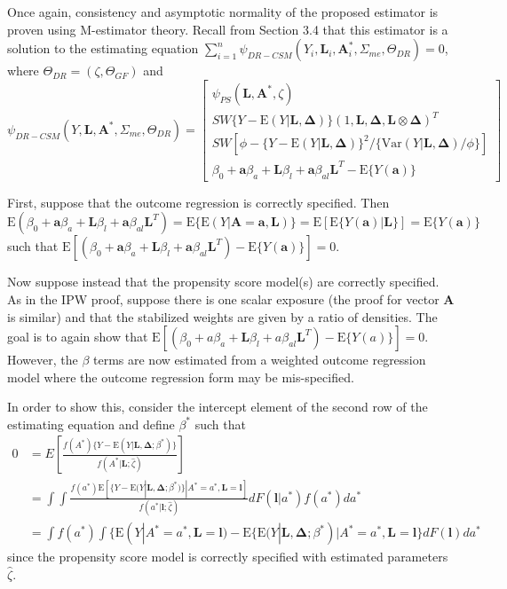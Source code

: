 \documentclass[12pt]{article}
\begin{document}
Once again, consistency and asymptotic normality of the proposed estimator is proven using M-estimator theory. Recall from Section 3.4 that this estimator is a solution to the estimating equation $\sum_{i=1}^{n} \psi_{DR-CSM}(Y_{i}, \bm{L}_{i}, \bm{A}_{i}^{*}, \Sigma_{me}, \Theta_{DR}) = 0$, where $\Theta_{DR} = (\zeta, \Theta_{GF})$ and
\begin{equation*}
    \psi_{DR-CSM}(Y, \bm{L}, \bm{A}^{*}, \Sigma_{me}, \Theta_{DR}) =
    \begin{bmatrix}
        \psi_{PS}(\bm{L}, \bm{A}^{*}, \zeta) \\
       SW\{ Y - \text{E}(Y | \bm{L}, \bm{\Delta}) \} (1, \bm{L}, \bm{\Delta}, \bm{L} \otimes \bm{\Delta})^{T} \\
        SW[\phi - \{ Y - \text{E}(Y | \bm{L}, \bm{\Delta}) \}^{2} / \{ \text{Var}(Y | \bm{L}, \bm{\Delta}) / \phi \}] \\
        \beta_{0} + \bm{a}\beta_{a} + \bm{L}\beta_{l} +
        \bm{a}\beta_{al}\bm{L}^{T} - \text{E} \{ Y(\bm{a}) \}
    \end{bmatrix}
\end{equation*}

First, suppose that the outcome regression is correctly specified. Then $\text{E}( \beta_{0} + \bm{a}\beta_{a} + \bm{L}\beta_{l} + \bm{a}\beta_{al}\bm{L}^{T}) = \text{E} \{ \text{E}(Y | \bm{A} = \bm{a}, \bm{L}) \} = \text{E}[\text{E} \{ Y(\bm{a}) | \bm{L} \}] = \text{E} \{ Y(\bm{a}) \}$ such that $\text{E}[(\beta_{0} + \bm{a}\beta_{a} + \bm{L}\beta_{l} + \bm{a}\beta_{al}\bm{L}^{T}) - \text{E} \{ Y(\bm{a}) \}] = 0$.

Now suppose instead that the propensity score model(s) are correctly specified. As in the IPW proof, suppose there is one scalar exposure (the proof for vector $\bm{A}$ is similar) and that the stabilized weights are given by a ratio of densities. The goal is to again show that $\text{E}[(\beta_{0} + a\beta_{a} + \bm{L}\beta_{l} + a\beta_{al}\bm{L}^{T}) - \text{E} \{ Y(a) \}] = 0$. However, the $\beta$ terms are now estimated from a weighted outcome regression model where the outcome regression form may be mis-specified.

In order to show this, consider the intercept element of the second row of the estimating equation and define $\beta^{*}$ such that
\begin{align*}
0 &= E \left [ \frac{f(A^{*}) \{ Y - \text{E}(Y | \bm{L}, \bm{\Delta}; \beta^{*}) \}}{f(A^{*} | \bm{L}; \hat{\zeta})} \right ] \\
&= \int \int \frac{f(a^{*})\text{E} [ \{ Y - \text{E}(Y | \bm{L}, \bm{\Delta}; \beta^{*}) \} | A^{*} = a^{*}, \bm{L} = \bm{l} ]}{f(a^{*} | \bm{l}; \hat{\zeta})} dF(\bm{l} | a^{*}) f(a^{*})da^{*} \\
&= \int f(a^{*}) \int \{\text{E}(Y | A^{*} = a^{*}, \bm{L} = \bm{l}) - \text{E} \{ \text{E}(Y | \bm{L}, \bm{\Delta}; \beta^{*}) | A^{*} = a^{*}, \bm{L} = \bm{l} \} dF(\bm{l}) da^{*}
\end{align*}
since the propensity score model is correctly specified with estimated parameters $\hat{\zeta}$.
\end{document}
